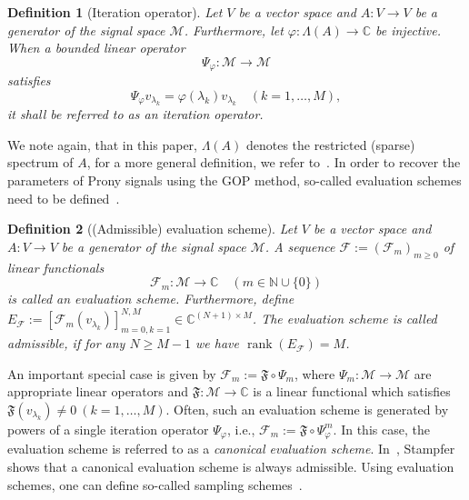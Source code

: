 \documentclass{arxiv}
\newcommand{\C}{\mathbb{C}}
\DeclareMathOperator{\rank}{rank}
\newcommand{\funF}{\mathfrak{F}}
\newcommand{\cM}{\mathcal{M}}
\newtheorem{definition}{Definition}[section]
\begin{document}
\begin{definition}[Iteration operator]
    \label{def:iterop}
    Let $V$ be a vector space and $A : V \to V$ be a generator of the signal space $\cM$. Furthermore, let $\varphi: \Lambda(A) \to \mathbb{C}$ be injective. When a bounded linear operator
    $$
        \Psi_{\varphi} : \cM \to \cM
    $$
    satisfies 
    $$
        \Psi_{\varphi}v_{\lambda_k} = \varphi(\lambda_k) v_{\lambda_k} \quad (k=1,\ldots,M),
    $$
    it shall be referred to as an \emph{iteration operator}. 
\end{definition}
We note again, that in this paper, $\Lambda(A)$ denotes the restricted (sparse) spectrum of $A$, for a more general definition, we refer to~\cite[Def.~2.2.4]{stampfer2019generalized}. In order to recover the parameters of Prony signals using the GOP method, so-called evaluation schemes need to be defined~\cite{stampfer2019generalized, stampfer2020generalized}.

\begin{definition}[(Admissible) evaluation scheme] Let $V$ be a vector space and $A : V \to V$ be a generator of the signal space $\cM$.
A sequence $\mathcal{F} := {(\mathcal{F}_m)}_{m \ge 0}$ of linear functionals
$$
    \mathcal{F}_m : \cM \to \mathbb{C} \quad (m \in \mathbb{N} \cup \{0\})
$$
is called an \emph{evaluation scheme}. Furthermore,  define $E_{\mathcal{F}} := \left[ \mathcal{F}_m(v_{\lambda_k}) \right]_{m=0, k = 1}^{N,M} \in \C^{(N+1) \times M}$. The evaluation scheme is called \emph{admissible}, if for any $N \geq M - 1$ we have $\rank(E_\mathcal{F}) = M$.
\end{definition}

An important special case is given by $\mathcal{F}_m := \funF \circ \Psi_m$, where $\Psi_m : \cM \to \cM$ are appropriate linear operators and $\funF : \cM \to \mathbb{C}$ is a linear functional which satisfies $\funF(v_{\lambda_k}) \neq 0 \ (k=1,\ldots,M)$. Often, such an evaluation scheme is generated by powers of a single iteration operator $\Psi_\varphi$, i.e., $\mathcal{F}_m := \funF \circ \Psi_\varphi^m$. In this case, the evaluation scheme is referred to as a \emph{canonical evaluation scheme}. In~\cite{stampfer2019generalized}, Stampfer shows that a canonical evaluation scheme is always admissible. 
Using evaluation schemes, one can define so-called sampling schemes~\cite{stampfer2019generalized, stampfer2020generalized}.
\end{document}
